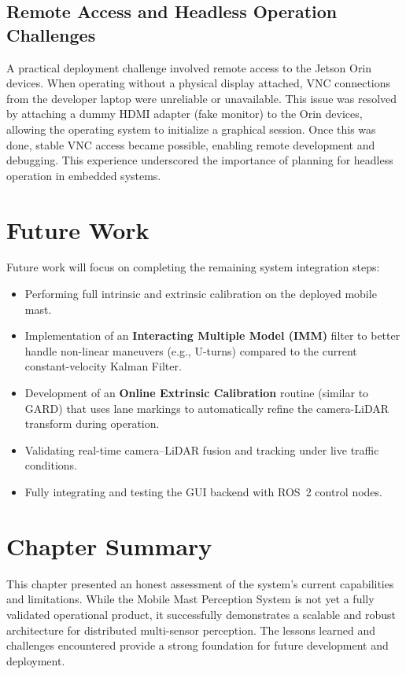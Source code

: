 \documentclass[12pt,a4paper]{report}
\begin{document}
{\subsection{Remote Access and Headless Operation Challenges}
A practical deployment challenge involved remote access to the Jetson Orin devices. When operating without a physical display attached, VNC connections from the developer laptop were unreliable or unavailable. This issue was resolved by attaching a dummy HDMI adapter (fake monitor) to the Orin devices, allowing the operating system to initialize a graphical session. Once this was done, stable VNC access became possible, enabling remote development and debugging. This experience underscored the importance of planning for headless operation in embedded systems.

\section{Future Work}
Future work will focus on completing the remaining system integration steps:
\begin{itemize}
    \item Performing full intrinsic and extrinsic calibration on the deployed mobile mast.
    \item Implementation of an \textbf{Interacting Multiple Model (IMM)} filter to better handle non-linear maneuvers (e.g., U-turns) compared to the current constant-velocity Kalman Filter.
    \item Development of an \textbf{Online Extrinsic Calibration} routine (similar to GARD) that uses lane markings to automatically refine the camera-LiDAR transform during operation.
    \item Validating real-time camera–LiDAR fusion and tracking under live traffic conditions.
    \item Fully integrating and testing the GUI backend with ROS~2 control nodes.
\end{itemize}

\section{Chapter Summary}
This chapter presented an honest assessment of the system’s current capabilities and limitations. While the Mobile Mast Perception System is not yet a fully validated operational product, it successfully demonstrates a scalable and robust architecture for distributed multi-sensor perception. The lessons learned and challenges encountered provide a strong foundation for future development and deployment.


}
\end{document}
